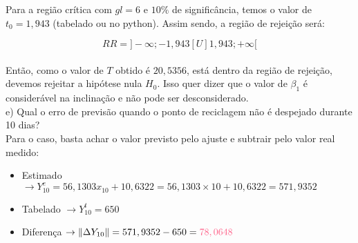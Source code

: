 Para a região crítica com $gl=6$ e $10\%$ de significância, temos o valor de $t_0 = 1,943$ (tabelado ou no python). Assim sendo, a região de rejeição será:


\[
    RR = ]-\infty; -1,943[U]1,943;+\infty[
\]
\\

Então, como o valor de $T$ obtido é $20,5356$, está dentro da região de rejeição, \textcolor{COLOR2}{devemos rejeitar a hipótese nula $H_0$}. Isso quer dizer que o valor de $\beta_1$ é considerável na inclinação e não pode ser desconsiderado.\\

\noindent e) Qual o erro de previsão quando o ponto de reciclagem não é despejado durante 10 dias?\\

Para o caso, basta achar o valor previsto pelo ajuste e subtrair pelo valor real medido:

\begin{itemize}
    \item Estimado $\to Y^e_{10} = 56,1303x_{10} + 10,6322 = 56,1303\times10 + 10,6322 = 571,9352$\\
    \item Tabelado $\to Y^t_{10} = 650$\\
    \item Diferença $\to \|  \Delta Y_{10}\|  = 571,9352 - 650 = \textcolor{COLOR2}{78,0648}$\\
\end{itemize}

